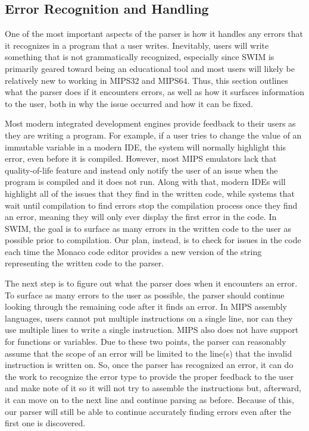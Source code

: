 \documentclass[
    paper=letter,
    parskip=half,
    fontsize=12pt,
    titlepage=firstiscover,
    toc=bibliography,
    numbers=endperiod
]{scrartcl}
\begin{document}
\subsection{Error Recognition and Handling}

One of the most important aspects of the parser is how it handles any
errors that it recognizes in a program that a user writes. Inevitably,
users will write something that is not grammatically recognized,
especially since SWIM is primarily geared toward being an educational
tool and most users will likely be relatively new to working in MIPS32
and MIPS64. Thus, this section outlines what the parser does if it
encounters errors, as well as how it surfaces information to the user,
both in why the issue occurred and how it can be fixed.

Most modern integrated development engines provide feedback to their
users as they are writing a program. For example, if a user tries to
change the value of an immutable variable in a modern IDE, the system
will normally highlight this error, even before it is compiled. However,
most MIPS emulators lack that quality-of-life feature and instead only
notify the user of an issue when the program is compiled and it does not
run. Along with that, modern IDEs will highlight all of the issues that
they find in the written code, while systems that wait until compilation
to find errors stop the compilation process once they find an error,
meaning they will only ever display the first error in the code. In
SWIM, the goal is to surface as many errors in the written code to the
user as possible prior to compilation. Our plan, instead, is to check
for issues in the code each time the Monaco code editor provides a new
version of the string representing the written code to the parser.

The next step is to figure out what the parser does when it encounters
an error. To surface as many errors to the user as possible, the parser
should continue looking through the remaining code after it finds an
error. In MIPS assembly languages, users cannot put multiple
instructions on a single line, nor can they use multiple lines to write
a single instruction. MIPS also does not have support for functions or
variables. Due to these two points, the parser can reasonably assume
that the scope of an error will be limited to the line(s) that the
invalid instruction is written on. So, once the parser has recognized an
error, it can do the work to recognize the error type to provide the
proper feedback to the user and make note of it so it will not try to
assemble the instructions but, afterward, it can move on to the next
line and continue parsing as before. Because of this, our parser will
still be able to continue accurately finding errors even after the first
one is discovered.
\end{document}

